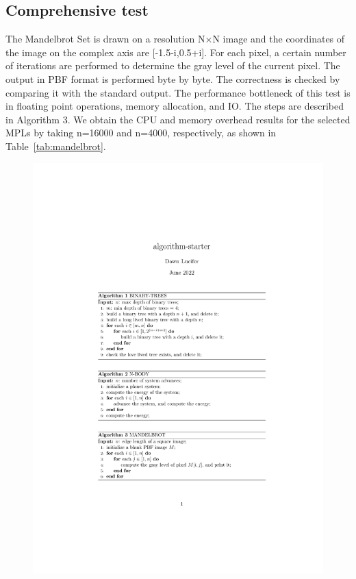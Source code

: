 \subsection{Comprehensive test}

The Mandelbrot Set is drawn on a resolution N×N image and the coordinates of the image on the complex axis are [-1.5-i,0.5+i]. For each pixel, a certain number of iterations are performed to determine the gray level of the current pixel. The output in PBF format is performed byte by byte. The correctness is checked by comparing it with the standard output. The performance bottleneck of this test is in floating point operations, memory allocation, and IO.
The steps are described in Algorithm 3.
We obtain the CPU and memory overhead results
for the selected MPLs by taking n=16000 and n=4000, respectively,
as shown in Table~\ref{tab:mandelbrot}.

\begin{figure}[htbp]
    \centerline{\includegraphics[scale=0.8]{figures/mandelbrot}}
    \label{fig:mandelbrot}
\end{figure}



